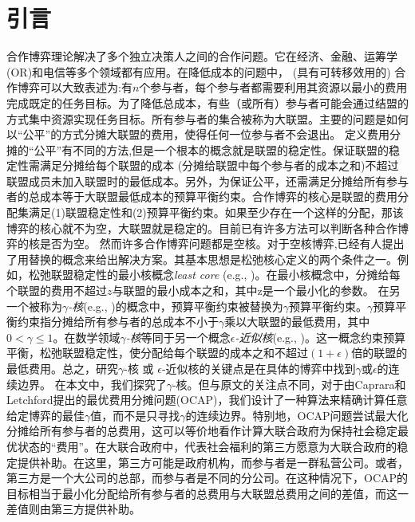 \documentclass[UTF8]{article}
\begin{document}
\section{引言}
合作博弈理论解决了多个独立决策人之间的合作问题。它在经济、金融、运筹学(OR)和电信等多个领域都有应用。在降低成本的问题中， (具有可转移效用的) 合作博弈可以大致表述为:有$n$个参与者，每个参与者都需要利用其资源以最小的费用完成既定的任务目标。为了降低总成本，有些（或所有）参与者可能会通过结盟的方式集中资源实现任务目标。所有参与者的集合被称为大联盟。主要的问题是如何以“公平”的方式分摊大联盟的费用，使得任何一位参与者不会退出。
定义费用分摊的“公平”有不同的方法,但是一个根本的概念就是联盟的稳定性。保证联盟的稳定性需满足分摊给每个联盟的成本 (分摊给联盟中每个参与者的成本之和)不超过联盟成员未加入联盟时的最低成本。另外，为保证公平，还需满足分摊给所有参与者的总成本等于大联盟最低成本的预算平衡约束。合作博弈的核心是联盟的费用分配集满足(1)联盟稳定性和(2)预算平衡约束。如果至少存在一个这样的分配，那该博弈的核心就不为空，大联盟就是稳定的。目前已有许多方法可以判断各种合作博弈的核是否为空。
然而许多合作博弈问题都是空核。对于空核博弈,已经有人提出了用替换的概念来给出解决方案。其基本思想是松弛核心定义的两个条件之一。例如，松弛联盟稳定性的最小核概念{\em least core} (e.g., \citealt{maschler1979geometric,Kern2003,Uhan2010,Uhan2013LeastCore})。在最小核概念中，分摊给每个联盟的费用不超过$z$与联盟的最小成本之和，其中z是一个最小化的参数。
在另一个被称为{\em $\gamma$-核}(e.g., \citealt{Jain2007CostSharing})的概念中，预算平衡约束被替换为$\gamma$预算平衡约束。$\gamma$预算平衡约束指分摊给所有参与者的总成本不小于$\gamma$乘以大联盟的最低费用，其中$0<\gamma\leq 1$。在数学领域{\em $\gamma$-核}等同于另一个概念{\em $\epsilon$-近似核}(e.g., \citealt{Faigle1998EuclideanTSPGamesCore,Blaser2008MetricTSPGamesCore})。这一概念约束预算平衡，松弛联盟稳定性，使分配给每个联盟的成本之和不超过$(1+\epsilon)$倍的联盟的最低费用。总之，研究$\gamma$-核 或 $\epsilon$-近似核的关键点是在具体的博弈中找到$\gamma$或$\epsilon$的连续边界。
在本文中，我们探究了$\gamma$-核。但与原文的关注点不同，对于由Caprara和Letchford提出的最优费用分摊问题(OCAP)，我们设计了一种算法来精确计算任意给定博弈的最佳$\gamma$值，而不是只寻找$\gamma$的连续边界。特别地，OCAP问题尝试最大化分摊给所有参与者的总费用\cite{Caprara2010LPB}，这可以等价地看作计算大联合政府为保持社会稳定最优状态的“费用”。在大联合政府中，代表社会福利的第三方愿意为大联合政府的稳定提供补助。在这里，第三方可能是政府机构，而参与者是一群私营公司。或者，第三方是一个大公司的总部，而参与者是不同的分公司。在这种情况下，OCAP的目标相当于最小化分配给所有参与者的总费用与大联盟总费用之间的差值，而这一差值则由第三方提供补助。
\end{document}
